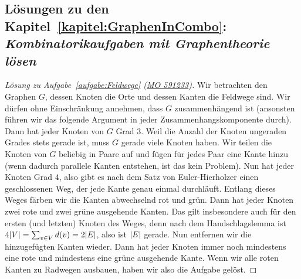 
\subsection*{Lösungen zu den Kapitel~\ref{kapitel:GraphenInCombo}: \emph{Kombinatorikaufgaben mit Graphentheorie lösen}}

\begin{proof}[Lösung zu Aufgabe~\ref{aufgabe:Feldwege} \textmd{(\href{https://www.mathematik-olympiaden.de/moev/index.php?option=com_download&thema=a&datei=A59123a.pdf&format=raw}{MO 591233})}]
	Wir betrachten den Graphen $G$, dessen Knoten die Orte und dessen Kanten die Feldwege sind. Wir dürfen ohne Einschränkung annehmen, dass $G$ zusammenhängend ist (ansonsten führen wir das folgende Argument in jeder Zusammenhangskomponente durch). Dann hat jeder Knoten von $G$ Grad $3$. Weil die Anzahl der Knoten ungeraden Grades stets gerade ist, muss $G$ gerade viele Knoten haben. Wir teilen die Knoten von $G$ beliebig in Paare auf und fügen für jedes Paar eine Kante hinzu (wenn dadurch parallele Kanten entstehen, ist das kein Problem). Nun hat jeder Knoten Grad $4$, also gibt es nach dem Satz von Euler-Hierholzer einen geschlossenen Weg, der jede Kante genau einmal durchläuft. Entlang dieses Weges färben wir die Kanten abwechselnd rot und grün. Dann hat jeder Knoten zwei rote und zwei grüne ausgehende Kanten. Das gilt insbesondere auch für den ersten (und letzten) Knoten des Weges, denn nach dem Handschlagslemma ist $4\lvert V\rvert=\sum_{v\in V}d(v)=2\lvert E\rvert$, also ist $\lvert E\rvert$ gerade. Nun entfernen wir die hinzugefügten Kanten wieder. Dann hat jeder Knoten immer noch mindestens eine rote und mindestens eine grüne ausgehende Kante. Wenn wir alle roten Kanten zu Radwegen ausbauen, haben wir also die Aufgabe gelöst.
\end{proof}

